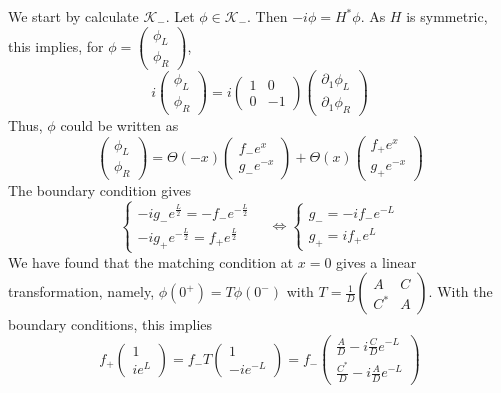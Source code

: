 We start by calculate $\mathcal{K}_-$. Let $\phi \in \mathcal{K}_-$. Then $- i \phi = H^* \phi$. As $H$ is symmetric, this implies, for $\phi = \begin{pmatrix} \phi_L \\  \phi_R \end{pmatrix}$, 
\begin{equation}
i \begin{pmatrix} \phi_L \\ \phi_R \end{pmatrix} = 
i \begin{pmatrix} 1 & 0  \\ 0  &  -1 \end{pmatrix} 
\begin{pmatrix} \partial_1 \phi_L  \\  \partial_1\phi_R \end{pmatrix}
\end{equation} 
Thus, $\phi$ could be written as
\begin{equation}
\begin{pmatrix} \phi_L \\ \phi_R \end{pmatrix} = 
\Theta(-x) \begin{pmatrix} f_- e^x  \\ g_-  e^{-x} \end{pmatrix} + 
\Theta(x) \begin{pmatrix} f_+ e^x  \\ g_+  e^{-x} \end{pmatrix}
\end{equation}
The boundary condition gives
\begin{equation}
\begin{cases}
-i g_- e^{\frac{L}{2}} = - f_- e^{-\frac{L}{2}} \\
-ig_+e^{-\frac{L}{2}} = f_+ e^{\frac{L}{2}}
\end{cases} \quad \Leftrightarrow
\begin{cases}
g_- = -i f_- e^{-L} \\
g_+ = i f_+ e^L
\end{cases}
\end{equation}
We have found that the matching condition at $x=0$ gives a linear transformation, namely, $\phi(0^+) = T\phi(0^-)$ with $T = \frac{1}{D}\begin{pmatrix} A & C \\ C^* & A \end{pmatrix}$. 
With the boundary conditions, this implies
\begin{equation}
f_+ \begin{pmatrix} 1 \\ ie^L \end{pmatrix}
= f_- T \begin{pmatrix} 1 \\ -ie^{-L} \end{pmatrix}
= f_- \begin{pmatrix} \frac{A}{D} - i\frac{C}{D} e^{-L}  \\
\frac{C^*}{D} - i \frac{A}{D} e^{-L} \end{pmatrix}
\end{equation}
